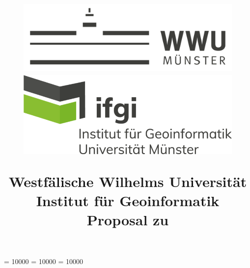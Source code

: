 \documentclass[a4paper,11pt,pdftex, parskip]{scrreprt}
\begin{document}
\widowpenalty = 10000
\clubpenalty = 10000
\displaywidowpenalty = 10000
\begin{titlepage}

  
    \title{
        \begin{figure}[t]
            \centering
            \includegraphics[scale = 0.125, keepaspectratio]{Logos/wwu_logo.png}
            \hspace{1cm}
            \includegraphics[scale = 0.9, keepaspectratio]{Logos/ifgi_logo.png}
        \end{figure}
          
           
        \textnormal{ 
            \normalsize \Large 
            Westfälische Wilhelms Universität \\ Institut für Geoinformatik\\
            \vspace{3cm}
            Proposal zu\\}
        \grqq
        \vspace{1,5cm}}


\end{titlepage}
\end{document}
